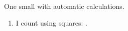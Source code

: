\documentclass[12pt]{article}
\begin{document}
One small  with automatic calculations.

\begin{enumerate}
    \item I count using squares: .
\end{enumerate}
\end{document}
